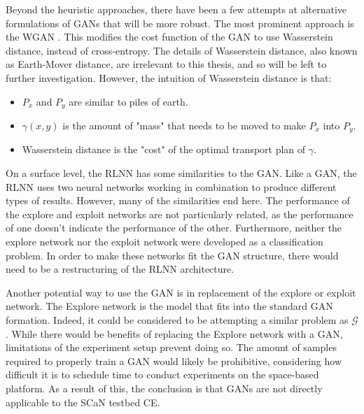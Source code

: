 \documentclass[11pt]{report}
\begin{document}
	\par Beyond the heuristic approaches, there have been a few attempts at alternative formulations of GANs that will be more robust. The most prominent approach is the WGAN \cite{bg:wganPaper}. This modifies the cost function of the GAN to use Wasserstein distance, instead of cross-entropy. The details of Wasserstein distance, also known as Earth-Mover distance, are irrelevant to this thesis, and so will be left to further investigation. However, the intuition of Wasserstein distance is that:  
	\begin{itemize}
		\item $P_x$ and $P_y$ are similar to piles of earth. 
		\item $\gamma(x,y)$ is the amount of "mass" that needs to be moved to make $P_x$ into $P_y$.
		\item Wasserstein distance is the "cost" of the optimal transport plan of $\gamma$.
	\end{itemize}
	\par On a surface level, the RLNN has some similarities to the GAN. Like a GAN, the RLNN uses two neural networks working in combination to produce different types of results. However, many of the similarities end here. The performance of the explore and exploit networks are not particularly related, as the performance of one doesn't indicate the performance of the other. Furthermore, neither the explore network nor the exploit network were developed as a classification problem. In order to make these networks fit the GAN structure, there would need to be a restructuring of the RLNN architecture.
	\par Another potential way to use the GAN is in replacement of the explore or exploit network. The Explore network is the model that fits into the standard GAN formation. Indeed, it could be considered to be attempting a similar problem as $\mathcal{G}$. While there would be benefits of replacing the Explore network with a GAN, limitations of the experiment setup prevent doing so. The amount of samples required to properly train a GAN would likely be prohibitive, considering how difficult it is to schedule time to conduct experiments on the space-based platform. As a result of this, the conclusion is that GANs are not directly applicable to the SCaN testbed CE.
	
\end{document}

